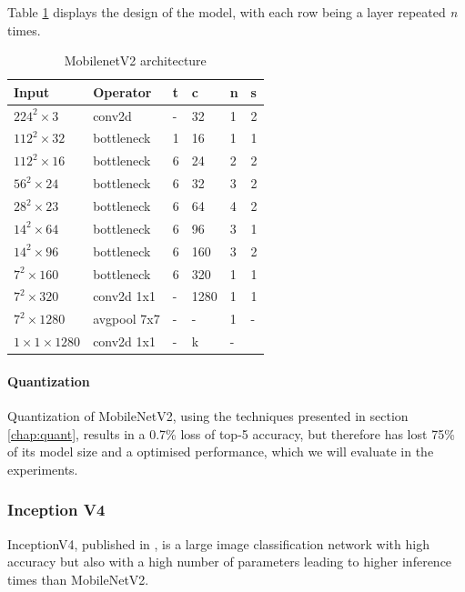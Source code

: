 Table \ref{table:mobilenetArchi} displays the design of the model, with each row being a layer repeated \emph{n} times. 
\begin{table}[]

\centering
\caption{MobilenetV2 architecture \cite{DBLP:journals/corr/abs-1801-04381}}
\label{table:mobilenetArchi}
\begin{tabular}{@{}llllll@{}}

\toprule
Input & Operator & t & c & n & s \\ \midrule
$224^2\times 3$ & conv2d & - & 32 & 1 & 2 \\
$112^2\times 32$ & bottleneck & 1 & 16 & 1 & 1 \\
$112^2\times 16$ & bottleneck & 6 & 24 & 2 & 2 \\
$56^2\times 24$ & bottleneck & 6 & 32 & 3 & 2 \\
$28^2\times 23$ & bottleneck & 6 & 64 & 4 & 2 \\
$14^2\times 64$ & bottleneck & 6 & 96 & 3 & 1 \\
$14^2\times 96$ & bottleneck & 6 & 160 & 3 & 2 \\
$7^2\times 160$ & bottleneck & 6 & 320 & 1 & 1 \\
$7^2\times 320$ & conv2d 1x1 & - & 1280 & 1 & 1 \\
$7^2\times 1280$ & avgpool 7x7 & - & - & 1 & - \\
$1\times 1\times 1280$ & conv2d 1x1 & - & k & - &  \\ \bottomrule
\end{tabular}
\end{table}
\paragraph{Quantization}
Quantization of MobileNetV2, using the techniques presented in section \ref{chap:quant}, results in a  0.7\% loss of top-5 accuracy, but therefore has lost 75\% of its model size and a optimised performance, which we will evaluate in the experiments.
\subsubsection{Inception V4}
InceptionV4, published in \cite{InceptionV4}, is a large image classification network with high accuracy but also with a high number of parameters leading to higher inference times than MobileNetV2.

